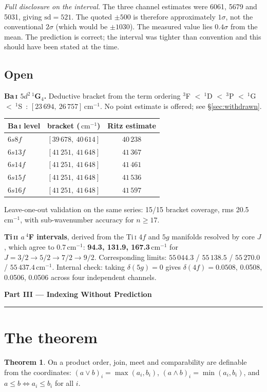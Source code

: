 \documentclass[11pt,a4paper]{article}
\newcommand{\parttitle}[1]{%
  \vspace{1.2\baselineskip}%
  {\noindent\LARGE\bfseries\color{acc} #1\par}%
  \vspace{0.4\baselineskip}\noindent\textcolor{acc}{\rule{\linewidth}{0.8pt}}%
  \vspace{0.6\baselineskip}\par}
\theoremstyle{definition}
\newtheorem{theorem}[proposition]{Theorem}
\newcommand{\cmi}{\,\ensuremath{\mathrm{cm}^{-1}}}
\begin{document}
\emph{Full disclosure on the interval.} The three channel estimates were 6061,
5679 and 5031, giving $\mathrm{sd}=521$. The quoted $\pm500$ is therefore
approximately $1\sigma$, not the conventional $2\sigma$ (which would be
$\pm1030$). The measured value lies $0.4\sigma$ from the mean. The prediction is
correct; the interval was tighter than convention and this should have been
stated at the time.

\subsection{Open}
\textbf{Ba\,\textsc{i} $5d^{2}\,^1$G$_4$.} Deductive bracket from the term
ordering $^3$F $<\ ^1$D $<\ ^3$P $<\ ^1$G $<\ ^1$S~\cite{racah}:
\textbf{$[23\,694,\ 26\,757]$\cmi}. No point estimate is offered; see
\S\ref{sec:withdrawn}.

\begin{center}\small
\begin{tabular}{@{}lcc@{}}
\toprule
Ba\,\textsc{i} level & bracket (\cmi) & Ritz estimate\\
\midrule
$6s8f$  & $[39\,678,\ 40\,614]$ & $40\,238$\\
$6s13f$ & $[41\,251,\ 41\,648]$ & $41\,367$\\
$6s14f$ & $[41\,251,\ 41\,648]$ & $41\,461$\\
$6s15f$ & $[41\,251,\ 41\,648]$ & $41\,536$\\
$6s16f$ & $[41\,251,\ 41\,648]$ & $41\,597$\\
\bottomrule
\end{tabular}
\end{center}
\vspace{2mm}

Leave-one-out validation on the same series: 15/15 bracket coverage, rms
20.5\cmi, with sub-wavenumber accuracy for $n\ge17$.

\textbf{Ti\,\textsc{ii} $a\,^4$F intervals}, derived from the Ti\,\textsc{i}
$4f$ and $5g$ manifolds resolved by core $J$, which agree to 0.7\cmi:
\textbf{94.3, 131.9, 167.3\cmi} for $J=3/2\to5/2\to7/2\to9/2$. Corresponding
limits: $55\,044.3$ / $55\,138.5$ / $55\,270.0$ / $55\,437.4$\cmi. Internal
check: taking $\delta(5g)=0$ gives $\delta(4f)=0.0508$, 0.0508, 0.0506, 0.0506
across four independent channels.

\parttitle{Part III --- Indexing Without Prediction}

\section{The theorem}
\begin{theorem}
On a product order, join, meet and comparability are definable from the
coordinates: $(a\vee b)_i=\max(a_i,b_i)$, $(a\wedge b)_i=\min(a_i,b_i)$, and
$a\le b \iff a_i\le b_i$ for all $i$.
\end{theorem}
\end{document}
